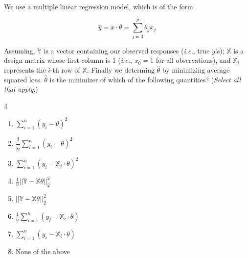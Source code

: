 \documentclass{article}
\newcounter{problem}
\begin{document}
	\begin{problem}[4]
		We use a multiple linear regression model, which is of the form
		
		\begin{equation*}
			\hat{y}=x\cdot\theta=\sum_{j=0}^{p}\theta_jx_j
		\end{equation*}
	
		Assuming, \(\mathbb{Y}\) is a vector containing our observed responses (\textit{i.e.}, true \(y\)'s); \(\mathbb{X}\) is a design matrix whose first column is 1 (\textit{i.e.}, \(x_0=1\) for all observations), and \(\mathbb{X}_i\) represents the \(i\)-th row of \(\mathbb{X}\). Finally we determing \(\hat{\theta}\) by minimizing average squared loss. \(\hat{\theta}\) is the minimizer of which of the following quantities? (\textit{Select all that apply}.)
		
		\begin{multicols}{4}
			\begin{enumerate}[label=(\alph*)]
				\item \(\displaystyle\sum_{i=1}^n(y_i-\theta)^2\)
				\item \(\dfrac{1}{n}\displaystyle\sum_{i=1}^n(y_i-\theta)^2\)
				\item \(\displaystyle\sum_{i=1}^n(y_i-\mathbb{X}_i\cdot\theta)^2\)
				\item \(\displaystyle{\frac1n||\mathbb{Y}-\mathbb{X}\theta||^2_2}\)
				\item \(\displaystyle{||\mathbb{Y}-\mathbb{X}\theta||^2_2}\)
				\item \(\displaystyle\frac1n\sum_{i=1}^n(y_i-\mathbb{X}_i\cdot\theta)\)
				\item \(\displaystyle\sum_{i=1}^n(y_i-\mathbb{X}_i\cdot\theta)\)
				\item None of the above
			\end{enumerate}
		\end{multicols}
	\end{problem}
\end{document}

